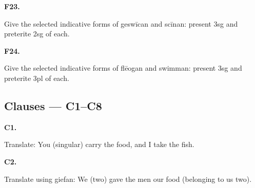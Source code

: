 \par\begin{minipage}{\linewidth}\raggedright
\textbf{F23.}

Give the selected indicative forms of geswīcan and scīnan: present 3sg and preterite 2sg of each.

\end{minipage}\par\addvspace{4pt}

\par\begin{minipage}{\linewidth}\raggedright
\textbf{F24.}

Give the selected indicative forms of flēogan and swimman: present 3sg and preterite 3pl of each.

\end{minipage}\par\addvspace{4pt}

\subsection*{Clauses — C1–C8}

\par\begin{minipage}{\linewidth}\raggedright
\textbf{C1.}

Translate: You (singular) carry the food, and I take the fish.

\end{minipage}\par\addvspace{4pt}

\par\begin{minipage}{\linewidth}\raggedright
\textbf{C2.}

Translate using giefan: We (two) gave the men our food (belonging to us two).

\end{minipage}\par\addvspace{4pt}

